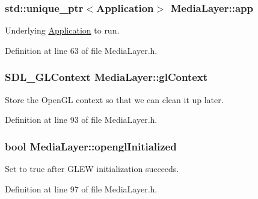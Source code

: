 \subsubsection[{app}]{\setlength{\rightskip}{0pt plus 5cm}std\+::unique\+\_\+ptr$<${\bf Application}$>$ Media\+Layer\+::app\hspace{0.3cm}{\ttfamily [private]}}\label{class_media_layer_a3cddf8a24527db756c3fe0534fce4f0c}


Underlying \hyperlink{class_application}{Application} to run. 



Definition at line 63 of file Media\+Layer.\+h.

\hypertarget{class_media_layer_a0e027d967e7c796efaed751e0b0a7090}{}
\subsubsection[{gl\+Context}]{\setlength{\rightskip}{0pt plus 5cm}S\+D\+L\+\_\+\+G\+L\+Context Media\+Layer\+::gl\+Context\hspace{0.3cm}{\ttfamily [private]}}\label{class_media_layer_a0e027d967e7c796efaed751e0b0a7090}


Store the Open\+G\+L context so that we can clean it up later. 



Definition at line 93 of file Media\+Layer.\+h.

\hypertarget{class_media_layer_abb67004f8dd82afd036233dfb225df3d}{}
\subsubsection[{opengl\+Initialized}]{\setlength{\rightskip}{0pt plus 5cm}bool Media\+Layer\+::opengl\+Initialized\hspace{0.3cm}{\ttfamily [private]}}\label{class_media_layer_abb67004f8dd82afd036233dfb225df3d}


Set to true after G\+L\+E\+W initialization succeeds. 



Definition at line 97 of file Media\+Layer.\+h.

\hypertarget{class_media_layer_aee28804a7f4e1fb771b11e93b218e387}{}
